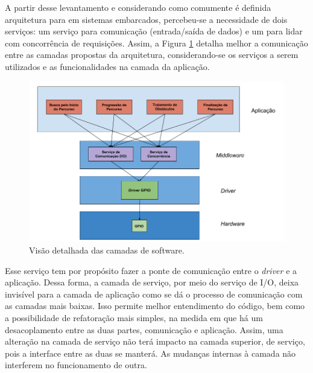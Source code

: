 A partir desse levantamento e considerando como comumente é definida arquitetura para \software em sistemas embarcados, percebeu-se a necessidade de dois serviços: um serviço para comunicação (entrada/saída de dados) e um para lidar com concorrência de requisições. Assim, a Figura \ref{fig:layer-soft} detalha melhor a comunicação entre as camadas propostas da arquitetura, considerando-se os serviços a serem utilizados e as funcionalidades na camada da aplicação.

\par
\begin{figure}[h]
  \centering
  \includegraphics[width=\textwidth]{figures/layers-soft.png}
  \caption{Visão detalhada das camadas de software.}
  \label{fig:layer-soft}
\end{figure}
\FloatBarrier
\par

Esse serviço tem por propósito fazer a ponte de comunicação entre o \textit{driver} e a aplicação. Dessa forma, a camada de serviço, por meio do serviço de I/O, deixa invisível para a camada de aplicação como se dá o processo de comunicação com as camadas mais baixas. Isso permite melhor entendimento do código, bem como a possibilidade de refatoração mais simples, na medida em que há um desacoplamento entre as duas partes, comunicação e aplicação. Assim, uma alteração na camada de serviço não terá impacto na camada superior, de serviço, pois a interface entre as duas se manterá. As mudanças internas à camada não interferem no funcionamento de outra.


